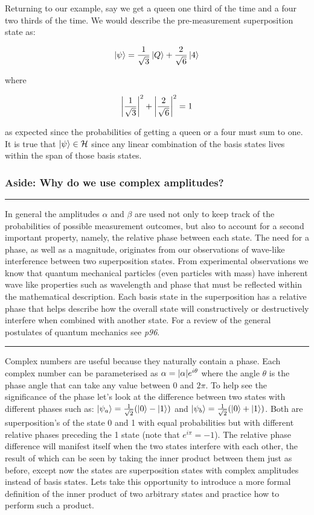 Returning to our example, say we get a queen one third of the time and a four two thirds of the time. We would describe the pre-measurement superposition state as:

\begin{equation}
\left\vert{\psi}\right\rangle = \frac{1}{\sqrt{3}} \left\vert{Q}\right\rangle + \frac{2}{\sqrt{6}}  \left\vert{4}\right\rangle
\end{equation}

where

\begin{equation}
\abs{\frac{1}{\sqrt{3}}}^{2}+ \abs{\frac{2}{\sqrt{6}}}^{2} =1
\end{equation}

as expected since the probabilities of getting a queen or a four must sum to one. It is true that $\left\vert{\psi}\right\rangle \in \mathcal{H}$ since any linear combination of the basis states lives within the span of those basis states. 
\subsubsection{Aside: Why do we use complex amplitudes?}
\hrule
\vspace{\baselineskip}
In general the amplitudes $\alpha$ and $\beta$ are used not only to keep track of the probabilities of possible measurement outcomes, but also to account for a second important property, namely, the relative phase between each state. The need for a phase, as well as a magnitude, originates from our observations of wave-like interference between two superposition states. From experimental observations we know that quantum mechanical particles (even particles with mass) have inherent wave like properties such as wavelength and phase that must be reflected within the mathematical description. Each basis state in the superposition has a relative phase that helps describe how the overall state will constructively or destructively interfere when combined with another state. For a review of the general postulates of quantum mechanics see \cite{nielsen_chuang_2010} \textit{p96}.\\
\hrule
\vspace{\baselineskip}

Complex numbers are useful because they naturally contain a phase. Each complex number can be parameterised as $\alpha = \abs{\alpha}e^{i\theta}$ where the angle $\theta$ is the phase angle that can take any value between 0 and $2\pi$. To help see the significance of the phase let's look at the difference between two states with different phases such as: $\left\vert{\psi_{a}}\right\rangle=\frac{1}{\sqrt{2}}(\left\vert{0}\right\rangle-\left\vert{1}\right\rangle)$ and $\left\vert{\psi_{b}}\right\rangle=\frac{1}{\sqrt{2}}(\left\vert{0}\right\rangle+\left\vert{1}\right\rangle)$. Both are superposition's of the state 0 and 1 with equal probabilities but with different relative phases preceding the 1 state (note that $e^{i\pi}=-1$). The relative phase difference will manifest itself when the two states interfere with each other, the result of which can be seen by taking the inner product between them just as before, except now the states are superposition states with complex amplitudes instead of basis states. Lets take this opportunity to introduce a more formal definition of the inner product of two arbitrary states and practice how to perform such a product.\\

